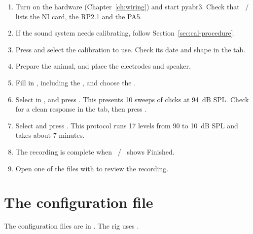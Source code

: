 \begin{enumerate}
  \item Turn on the hardware (Chapter~\ref{ch:wiring}) and start pyabr3. Check that
        ~/~ lists the NI card, the RP2.1 and the PA5.
  \item If the sound system needs calibrating, follow
        Section~\ref{sec:cal-procedure}.
  \item Press  and select the calibration to use. Check its date
        and shape in the  tab.
  \item Prepare the animal, and place the electrodes and speaker.
  \item Fill in , including the , and choose the
        .
  \item Select  in , and press
        . This presents 10 sweeps of clicks at 94~dB SPL. Check
        for a clean response in the  tab, then press .
  \item Select  and press . This protocol
        runs 17 levels from 90 to 10~dB SPL and takes about 7 minutes.
  \item The recording is complete when ~/~ shows Finished.
  \item Open one of the files with  to review the recording.
\end{enumerate}

\section{The configuration file}
\label{sec:config}

The configuration files are in . The rig uses .

